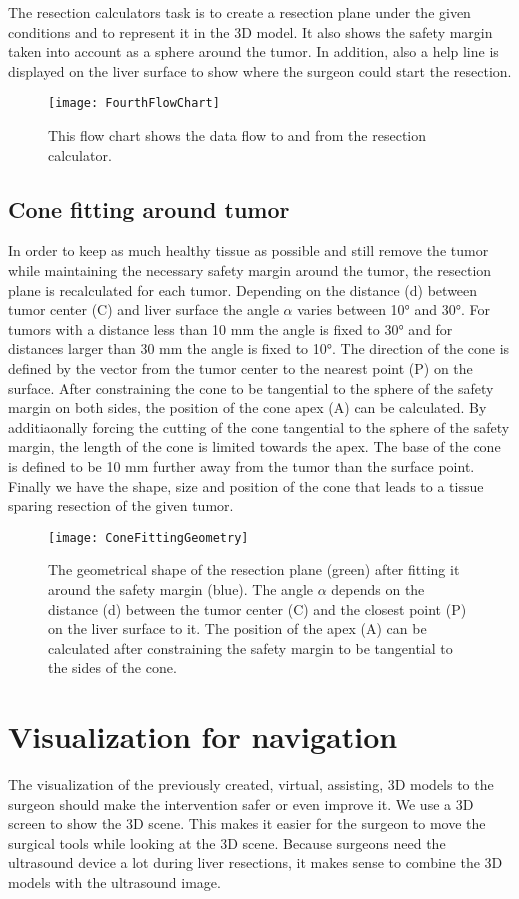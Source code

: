 The resection calculators task is to create a resection plane under the given
conditions and to represent it in the 3D model. It also shows the safety margin taken
into account as a sphere around the tumor. In addition, also a help line is displayed
on the liver surface to show where the surgeon could start the resection.
\begin{figure}[H]
  \centering
 \texttt{[image: FourthFlowChart]}
  \caption{This flow chart shows the data flow to and from the resection calculator.}
  \label{fig:FourthFlowChart}
\end{figure}

\subsection{Cone fitting around tumor}
In order to keep as much healthy tissue as possible and still remove the tumor
while maintaining the necessary safety margin around the tumor, the resection
plane is recalculated for each tumor. Depending on the distance (d) between tumor
center (C) and liver surface the angle $\alpha$ varies between 10° and 30°. For
tumors with a distance less than 10 mm the angle is fixed to 30° and for
distances larger than 30 mm the angle is fixed to 10°. The direction of the cone
is defined by the vector from the tumor center to the nearest point (P) on the
surface. After constraining the cone to be tangential to the sphere of the
safety margin on both sides, the position of the cone apex (A) can be calculated. By
additiaonally forcing the cutting of the cone tangential to the sphere of the
safety margin, the length of the cone is limited towards the apex. The base of
the cone is defined to be 10 mm further away from the tumor than the surface
point. Finally we have the shape, size and position of the cone that leads to a
tissue sparing resection of the given tumor.
\begin{figure}[H]
  \centering
 \texttt{[image: ConeFittingGeometry]}
  \caption{The geometrical shape of the resection plane (green) after fitting it
  around the safety margin (blue). The angle $\alpha$ depends on the distance (d)
  between the tumor center (C) and the closest point (P) on the liver surface to
  it. The position of the apex (A) can be calculated after constraining the
  safety margin to be tangential to the sides of the cone.}
  \label{fig:ConeFittingGeometry}
\end{figure}

\section{Visualization for navigation}
The visualization of the
previously created, virtual, assisting, 3D models to the surgeon should make the intervention
safer or even improve it. We use a 3D screen to show the 3D scene. This
makes it easier for the surgeon to move the surgical tools while looking at the
3D scene.
Because surgeons need the ultrasound device a lot during liver resections, it
makes sense to combine the 3D models with the ultrasound image. 
